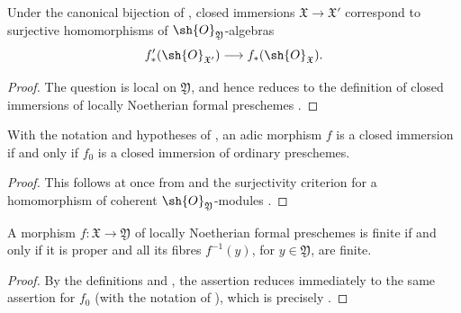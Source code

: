 \begin{corollary}[4.8.9]
\label{III.4.8.9}
Under the canonical bijection of , closed
immersions $\mathfrak{X}\to\mathfrak{X}'$ correspond to
surjective homomorphisms of $\sh{O}_{\mathfrak{Y}}$-algebras
\[
  f'_*(\sh{O}_{\mathfrak{X}'})
  \longrightarrow
  f_*(\sh{O}_{\mathfrak{X}}).
\]
\end{corollary}

\begin{proof}
The question is local on $\mathfrak{Y}$, and hence reduces to the
definition of closed immersions of locally Noetherian formal
preschemes .
\end{proof}

\begin{corollary}[4.8.10]
\label{III.4.8.10}
With the notation and hypotheses of , an adic
morphism $f$ is a closed immersion if and only if $f_0$ is a
closed immersion of ordinary preschemes.
\end{corollary}

\begin{proof}
This follows at once from  and the surjectivity
criterion for a homomorphism of coherent
$\sh{O}_{\mathfrak{Y}}$-modules .
\end{proof}

\begin{proposition}[4.8.11]
\label{III.4.8.11}
A morphism $f:\mathfrak{X}\to\mathfrak{Y}$ of locally Noetherian
formal preschemes
is finite if and only if it is proper and all its fibres
$f^{-1}(y)$, for $y\in\mathfrak{Y}$, are finite.
\end{proposition}

\begin{proof}
By the definitions  and , the
assertion reduces immediately to the same assertion for $f_0$
(with the notation of ), which is precisely
.
\end{proof}
